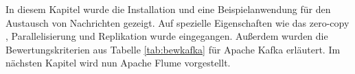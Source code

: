 
In diesem Kapitel wurde die Installation und eine Beispielanwendung für den Austausch von Nachrichten gezeigt. Auf spezielle Eigenschaften wie das zero-copy , Parallelisierung und Replikation wurde eingegangen. Außerdem wurden die Bewertungskriterien aus Tabelle \ref{tab:bewkafka} für Apache Kafka erläutert. Im nächsten Kapitel wird nun Apache Flume vorgestellt.


